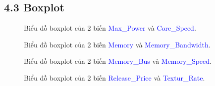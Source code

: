 \documentclass[a4paper]{article}
\begin{document}
\newpage
        \subsection*{4.3 Boxplot}
            \begin{figure}[H]
                \vspace{-20pt}
                \centering
                
                \caption{Biểu đồ boxplot của 2 biến \textcolor{blue}{Max\_Power} và \textcolor{blue}{Core\_Speed}.}
            \end{figure}
            \vspace{-29pt}
            \begin{figure}[H]
                \centering
                
                \caption{Biểu đồ boxplot của 2 biến \textcolor{blue}{Memory} và \textcolor{blue}{Memory\_Bandwidth}.}
            \end{figure}
            \vspace{-29pt}
            \begin{figure}[H]
                \centering
                
                \caption{Biểu đồ boxplot của 2 biến \textcolor{blue}{Memory\_Bus}  và \textcolor{blue}{Memory\_Speed}.}
            \end{figure}
            \vspace{-29pt}
            \begin{figure}[H]
                \centering
                
                \caption{Biểu đồ boxplot của 2 biến \textcolor{blue}{Release\_Price} và \textcolor{blue}{Textur\_Rate}.}
            \end{figure}
\end{document}
